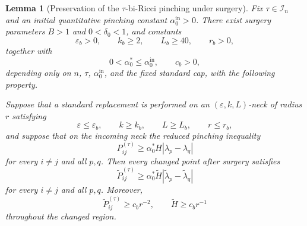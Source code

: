 \documentclass[11pt,reqno]{amsart}
\newtheorem{lemma}[proposition]{Lemma}
\theoremstyle{definition}
\theoremstyle{remark}
\numberwithin{equation}{section}
\newcommand{\eps}{\varepsilon}
\begin{document}
\begin{lemma}[Preservation of the $\tau$-bi-Ricci pinching under surgery]
  \label{lem:surgery-taubiric-preservation}
  Fix $\tau\in\mathcal I_n$ and an initial quantitative pinching constant
  $\alpha_0^{\mathrm{in}}>0$.  There exist surgery parameters
  $B>1$ and $0<\delta_0<1$, and constants
  \begin{equation*}
  \eps_b>0,\qquad
  k_b\geq2,\qquad
  L_b\geq40,\qquad
  r_b>0,
  \end{equation*}
  together with
  \begin{equation*}
  0<\alpha_0^*\leq\alpha_0^{\mathrm{in}},
  \qquad
  c_b>0,
  \end{equation*}
  depending only on $n$, $\tau$, $\alpha_0^{\mathrm{in}}$, and the fixed
  standard cap, with the following property.

  Suppose that a standard replacement is performed on an
  $(\eps,k,L)$-neck of radius $r$ satisfying
  \begin{equation*}
  \eps\leq\eps_b,\qquad
  k\geq k_b,\qquad
  L\geq L_b,\qquad
  r\leq r_b,
  \end{equation*}
  and suppose that on the incoming neck the reduced pinching inequality
  \begin{equation}\label{eq:incoming-surgery-taubiric}
    P_{ij}^{(\tau)}
    \geq
    \alpha_0^*H|\lambda_p-\lambda_q|
  \end{equation}
  for every $i\ne j$ and all $p,q$.  Then every changed point after surgery
  satisfies
  \begin{equation}\label{eq:surgery-taubiric-ratio}
    \widetilde P_{ij}^{(\tau)}
    \geq
    \alpha_0^*\widetilde H
    |\widetilde\lambda_p-\widetilde\lambda_q|
  \end{equation}
  for every $i\ne j$ and all $p,q$.  Moreover,
  \begin{equation}\label{eq:surgery-taubiric-strict}
    \widetilde P_{ij}^{(\tau)}
    \geq c_b r^{-2},
    \qquad
    \widetilde H\geq c_b r^{-1}
  \end{equation}
  throughout the changed region.
\end{lemma}
\end{document}
